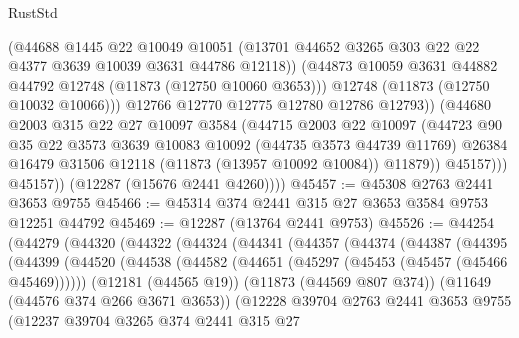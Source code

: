 \begin{lexlean}{RustStd}
\begin{coremodule}
                      (@44688
                        @1445
                        @22
                        @10049
                        @10051
                        (@13701 @44652 @3265 @303 @22 @22 @4377 @3639 @10039 @3631 @44786 @12118))
                      (@44873 @10059 @3631 @44882 @44792 @12748 (@11873 (@12750 @10060 @3653)))
                      @12748
                      (@11873 (@12750 @10032 @10066)))
                    @12766
                    @12770
                    @12775
                    @12780
                    @12786
                    @12793))
                (@44680
                  @2003
                  @315
                  @22
                  @27
                  @10097
                  @3584
                  (@44715
                    @2003
                    @22
                    @10097
                    (@44723
                      @90
                      @35
                      @22
                      @3573
                      @3639
                      @10083
                      @10092
                      (@44735 @3573 @44739 @11769)
                      @26384
                      @16479
                      @31506
                      @12118
                      (@11873 (@13957 @10092 @10084))
                      @11879))
                  @45157)))
            @45157))
        (@12287 (@15676 @2441 @4260))))
@45457 := @45308 @2763 @2441 @3653 @9755
@45466 := @45314 @374 @2441 @315 @27 @3653 @3584 @9753 @12251 @44792
@45469 := @12287 (@13764 @2441 @9753)
@45526 := @44254
    (@44279
      (@44320
        (@44322
          (@44324
            (@44341
              (@44357
                (@44374
                  (@44387
                    (@44395
                      (@44399
                        (@44520
                          (@44538
                            (@44582 (@44651 (@45297 (@45453 (@45457 (@45466 @45469))))))
                            (@12181 (@44565 @19))
                            (@11873 (@44569 @807 @374))
                            (@11649 (@44576 @374 @266 @3671 @3653))
                            (@12228
                              @39704
                              @2763
                              @2441
                              @3653
                              @9755
                              (@12237
                                @39704
                                @3265
                                @374
                                @2441
                                @315
                                @27

\end{coremodule}
\end{lexlean}
